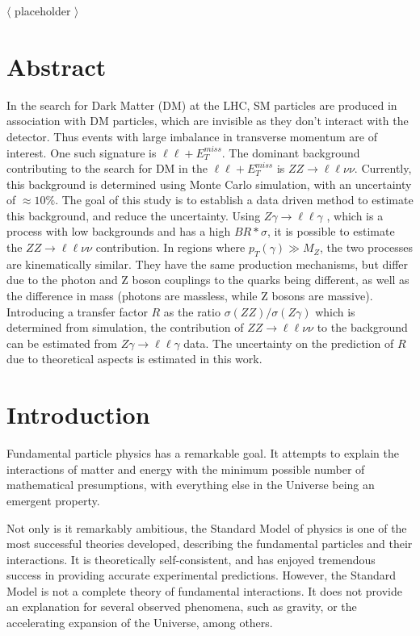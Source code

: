 \documentclass[11pt,a4paper,openright,twoside]{report}
\newcommand{\ZZ}{$ZZ\to \ell\ell\nu\nu$ }
\newcommand{\Zg}{$Z\gamma\to \ell\ell\gamma$ }
\newcommand\blankpage{%
    \null
    \thispagestyle{empty}%
    \addtocounter{page}{-1}%
    \newpage}
\begin{document}
$\langle$ placeholder $\rangle$

\newpage
\blankpage
\newpage

\chapter*{Abstract}
\setcounter{page}{1}
In the search for Dark Matter (DM) at the LHC, SM particles are produced in association with DM particles, which are invisible as they don't interact with the detector. Thus events with large imbalance in transverse momentum are of interest. One such signature is $\ell\ell + E_T^{miss}$. The dominant background contributing to the search for DM in the $\ell\ell + E_T^{miss}$ is $ZZ \rightarrow \ell\ell\nu\nu$.  Currently, this background is determined using Monte Carlo simulation, with an uncertainty of $\approx 10\%$. The goal of this study is to establish a data driven method to estimate this background, and reduce the uncertainty. Using \Zg, which is a process with low backgrounds and has a high $BR*\sigma$, it is possible to estimate the \ZZ contribution. In regions where $p_{T}(\gamma) \gg M_{Z}$, the two processes are kinematically similar. They have the same production mechanisms, but differ due to the photon and Z boson couplings to the quarks being different, as well as the difference in mass (photons are massless, while Z bosons are massive). Introducing a transfer factor $R$ as the ratio $\sigma(ZZ)/\sigma(Z\gamma)$ which is determined from simulation, the contribution of \ZZ to the background can be estimated from \Zg data. The uncertainty on the prediction of $R$ due to theoretical aspects is estimated in this work.
\thispagestyle{plain}
\tableofcontents
\thispagestyle{empty}
\cleardoublepage
{}
\chapter{Introduction}
\pagestyle{plain}
\setcounter{page}{1}
Fundamental particle physics has a remarkable goal. It attempts to explain the interactions of matter and energy with the minimum possible number of mathematical presumptions, with everything else in the Universe being an emergent property.

Not only is it remarkably ambitious, the Standard Model of physics is one of the most successful theories developed, describing the fundamental particles and their interactions\cite{griff}. It is theoretically self-consistent, and has enjoyed tremendous success in providing accurate experimental predictions. However, the Standard Model is not a complete theory of fundamental interactions. It does not provide an explanation for several observed phenomena, such as gravity, or the accelerating expansion of the Universe, among others.
\end{document}
